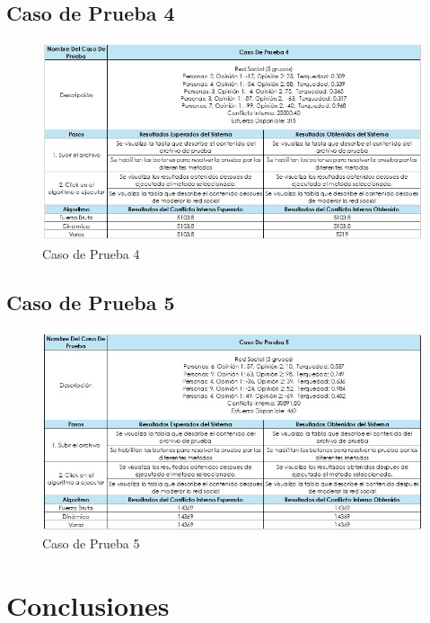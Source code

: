 \documentclass[11pt,letter]{article}
\begin{document}
\subsection{Caso de Prueba 4}
\begin{figure}[H]
    \centering
    \includegraphics[width=\linewidth]{resources/cp4.jpeg}
    \caption{Caso de Prueba 4}
    \label{fig:cp4}
\end{figure}

\subsection{Caso de Prueba 5}
\begin{figure}[H]
    \centering
    \includegraphics[width=\linewidth]{resources/cp5.jpeg}
    \caption{Caso de Prueba 5}
    \label{fig:cp5}
\end{figure}



\newpage

\section{Conclusiones}
\end{document}
